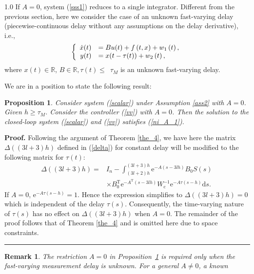 \documentclass[journal]{IEEEtran}
\newtheorem{proposition}{Proposition}
\newtheorem{remark}{Remark}
\newenvironment{proof}[1][Proof]{\noindent \textbf{#1.} }{\  \rule{0.5em}{0.5em}}
\begin{document}
\begin{spacing}{1.0}
If $A=0$, system (\ref{sss1}) reduces to a single integrator. Different from
the previous section, here we consider the case of an unknown fast-varying
delay (piecewise-continuous delay without any assumptions on the delay
derivative), i.e.,
\begin{equation}
\left\{
\begin{array}
[c]{rl}%
\dot{x}(t) & =Bu(t)+f\left(  t,x\right)  +w_{1}\left(  t\right)  ,\\
y(t) & =x(t-\tau(t))+w_{2}\left(  t\right)  ,
\end{array}
\right.  \label{scalar}%
\end{equation}
where $x(t)\in\mathbb{R}$, $B\in\mathbb{R},\tau(t)\leq$\ $\tau_{M}$ is an
unknown fast-varying delay.

We are in a position to state the following result:
\begin{proposition}
\label{corl1}Consider system (\ref{scalar}) under Assumption \ref{ass2} with
$A=0$. Given $h\geq\tau_{M}$. Consider the controller (\ref{vv}) with $A=0$.
Then the solution to the closed-loop system (\ref{scalar}) and (\ref{vv})
satisfies (\ref{ni_A_1}).
\end{proposition}
\begin{proof}
Following the argument of Theorem \ref{the_4}, we have here the matrix $\mathit{\Delta}((3l+3)h)$ defined in
(\ref{delta}) for constant delay will be modified to the following matrix for
$\tau(t)$:
\begin{align*}
\mathit{\Delta}((3l+3)h)=  &  I_{n}-\int_{(3l+2)h}^{(3l+3)h}\mathrm{e}%
^{-A(s-3lh)}B_{0}S(s)\,\\
&  \times B_{0}^{\mathrm{T}}\mathrm{e}^{-A^{\mathrm{T}}(s-3lh)}W_{\mathrm{c}%
}^{-1}\mathrm{e}^{-A\tau(s-h)}\mathrm{d}s.
\end{align*}
If $A=0$, $\mathrm{e}^{-A\tau(s-h)}=1$. Hence the expression simplifies to
$\mathit{\Delta}((3l+3)h)=0$ which is independent of the delay $\tau(s)$.
Consequently, the time-varying nature of $\tau(s)$ has no effect on
$\mathit{\Delta}((3l+3)h)$ when $A=0$. The remainder of the proof follows that of Theorem \ref{the_4} and is omitted here due to space constraints.
\end{proof}
\begin{remark}
\label{remark_tv_delay}
The restriction $A=0$ in Proposition~\ref{corl1} is required only when the
fast-varying measurement delay is unknown. For a general $A\neq0$, a known

\end{remark}
\end{spacing}
\end{document}

